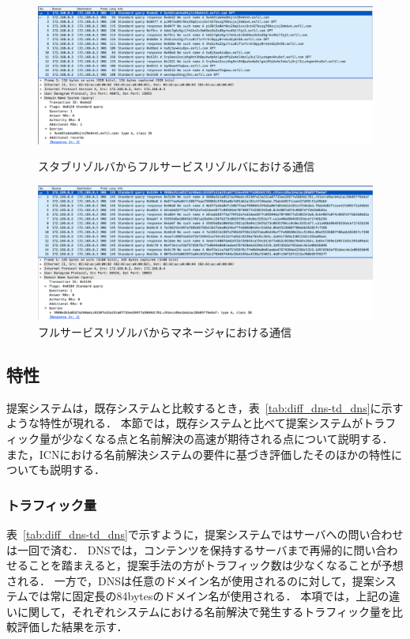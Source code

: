 \begin{figure}[p]
 \centering
 \includegraphics[width=14.5cm]{figure/stab-fullservice.png}
 \vspace{-1cm}
 \caption{スタブリゾルバからフルサービスリゾルバにおける通信}
 \label{fig:stab-fullservice}
 \vspace{1cm}
 \includegraphics[width=14.5cm]{figure/fullresolver-manager.png}
 \vspace{-1cm}
 \caption{フルサービスリゾルバからマネージャにおける通信}
 \label{fig:fullservice-manager}
\end{figure}

\newpage
\subsection{特性}
提案システムは，既存システムと比較するとき，表~\ref{tab:diff_dns-td_dns}に示すような特性が現れる．
本節では，既存システムと比べて提案システムがトラフィック量が少なくなる点と名前解決の高速が期待される点について説明する．
また，ICNにおける名前解決システムの要件に基づき評価したそのほかの特性についても説明する．


\subsubsection{トラフィック量}
表~\ref{tab:diff_dns-td_dns}で示すように，提案システムではサーバへの問い合わせは一回で済む．
DNSでは，コンテンツを保持するサーバまで再帰的に問い合わせることを踏まえると，提案手法の方がトラフィック数は少なくなることが予想される．
一方で，DNSは任意のドメイン名が使用されるのに対して，提案システムでは常に固定長の84bytesのドメイン名が使用される．
本項では，上記の違いに関して，それぞれシステムにおける名前解決で発生するトラフィック量を比較評価した結果を示す．

